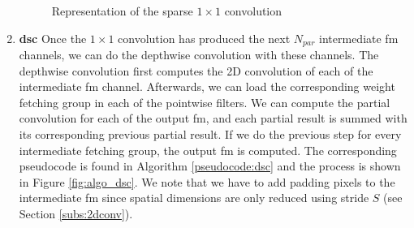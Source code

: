 \begin{enumerate}
\begin{figure}[H]
        \caption{Representation of the sparse $1 \times 1$ convolution}
        \label{fig:algo_11conv}
    \end{figure}
    \item \textbf{\acrshort{dsc}} Once the $1 \times 1$ convolution has produced the next $N_{par}$ intermediate \acrshort{fm} channels, we can do the depthwise convolution with these channels. The depthwise convolution first computes the 2D convolution of each of the intermediate \acrshort{fm} channel. Afterwards, we can load the corresponding weight fetching group in each of the pointwise filters. We can compute the partial convolution for each of the output \acrshort{fm}, and each partial result is summed with its corresponding previous partial result. If we do the previous step for every intermediate fetching group, the output \acrshort{fm} is computed. The corresponding pseudocode is found in Algorithm \ref{pseudocode:dsc} and the process is shown in Figure \ref{fig:algo_dsc}. We note that we have to add padding pixels to the intermediate \acrshort{fm} since spatial dimensions are only reduced using stride $S$ (see Section \ref{subs:2dconv}).
    \begin{algorithm}[H]
        \centering
        \begin{algorithmic}
             
                 
                     
                         
                             
                                     
                            \EndFor
                        \EndFor
                    \EndFor
                     
                         

\end{algorithmic}
\end{algorithm}
\end{enumerate}
